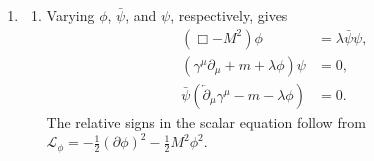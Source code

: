 \begin{enumerate}
\begin{enumerate}
\item
\begin{enumerate}
\item
Varying \(\phi\), \(\bar\psi\), and \(\psi\), respectively, gives
\[
 \boxed{\begin{aligned}
 (\Box-M^2)\phi&=\lambda\bar\psi\psi,\\
 (\gamma^\mu\partial_\mu+m+\lambda\phi)\psi&=0,\\
 \bar\psi(\overleftarrow{\partial}_\mu\gamma^\mu-m-\lambda\phi)&=0.
 \end{aligned}}
\]
The relative signs in the scalar equation follow from
\(\mathcal L_\phi=-\tfrac12(\partial\phi)^2-\tfrac12M^2\phi^2\).


\end{enumerate}
\end{enumerate}
\end{enumerate}
